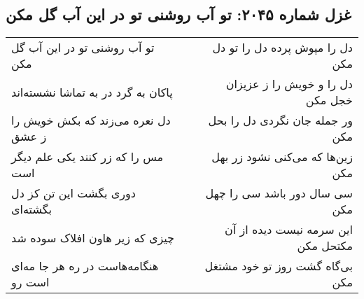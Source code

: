 \begin{center}
\section*{غزل شماره ۲۰۴۵: تو آب روشنی تو در این آب گل مکن}
\label{sec:2045}
\begin{longtable}{l p{0.5cm} r}
تو آب روشنی تو در این آب گل مکن
&&
دل را مپوش پرده دل را تو دل مکن
\\
پاکان به گرد در به تماشا نشسته‌اند
&&
دل را و خویش را ز عزیزان خجل مکن
\\
دل نعره می‌زند که بکش خویش را ز عشق
&&
ور جمله جان نگردی دل را بحل مکن
\\
مس را که زر کنند یکی علم دیگر است
&&
زین‌ها که می‌کنی نشود زر بهل مکن
\\
دوری بگشت این تن کز دل بگشته‌ای
&&
سی سال دور باشد سی را چهل مکن
\\
چیزی که زیر هاون افلاک سوده شد
&&
این سرمه نیست دیده از آن مکتحل مکن
\\
هنگامه‌هاست در ره هر جا مه‌ای است رو
&&
بی‌گاه گشت روز تو خود مشتغل مکن
\\
\end{longtable}
\end{center}
